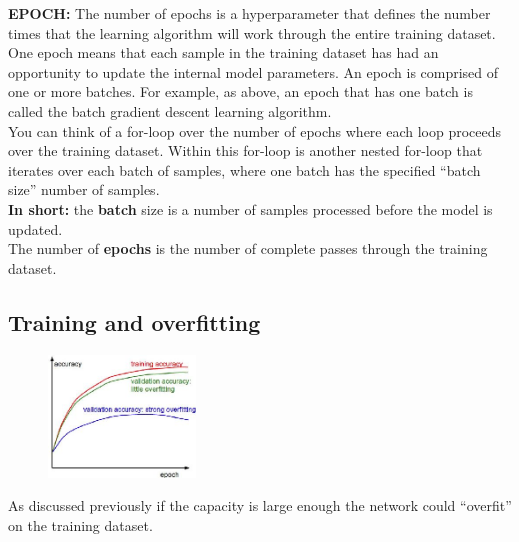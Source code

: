 \begin{tcolorbox}[width=\textwidth,colback={white},title={\textbf{22.} What are the definitions of learning rate, epochs and batches in the context of DNN training? },colbacktitle=red,coltitle=black]
\textbf{EPOCH:} The number of epochs is a hyperparameter that defines the number times that the learning algorithm will work through the entire training dataset.\\
One epoch means that each sample in the training dataset has had an opportunity to update the internal model parameters. An epoch is comprised of one or more batches. For example, as above, an epoch that has one batch is called the batch gradient descent learning algorithm.\\
You can think of a for-loop over the number of epochs where each loop proceeds over the training dataset. Within this for-loop is another nested for-loop that iterates over each batch of samples, where one batch has the specified “batch size” number of samples.\\


\textbf{In short:}
the \textbf{batch} size is a number of samples processed before the model is updated.\\
The number of \textbf{epochs} is the number of complete passes through the training dataset.\\

\end{tcolorbox}


\subsection{Training and overfitting}

\begin{figure}
	\includegraphics[width=0.35\textwidth]{figure_ml/training_overfitting.png}
\end{figure} 
As discussed previously if the capacity is large enough the network could “overfit” on the training dataset.


